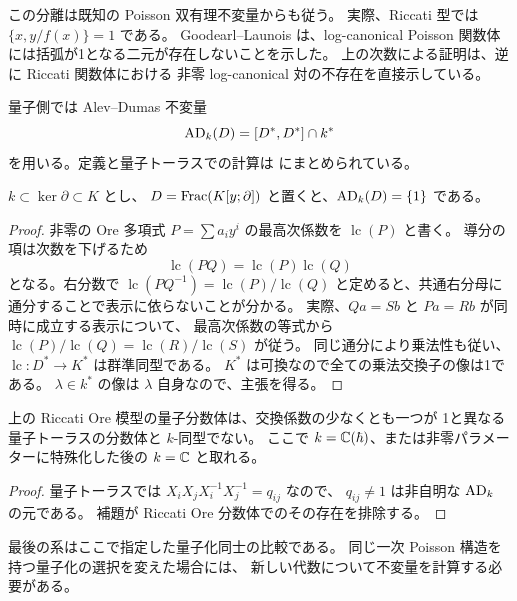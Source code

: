 この分離は既知の Poisson 双有理不変量からも従う。
実際、Riccati 型では $\{x,y/f(x)\}=1$ である。
Goodearl--Launois \cite[命題5.2(a)、系5.3]{GoodearlLaunois}
は、log-canonical Poisson 関数体には括弧が1となる二元が存在しないことを示した。
上の次数による証明は、逆に Riccati 関数体における
非零 log-canonical 対の不存在を直接示している。

量子側では Alev--Dumas 不変量
\[
 \operatorname{AD}_k(D)=[D^*,D^*]\cap k^*
\]
を用いる。定義と量子トーラスでの計算は
\cite[定義3.1、命題3.3]{GoodearlYakimov} にまとめられている。

\begin{lemma}\label{lem:differential-ad}
$k\subset\ker\partial\subset K$ とし、
$D=\operatorname{Frac}(K[y;\partial])$ と置くと、$\operatorname{AD}_k(D)=\{1\}$ である。
\end{lemma}
\begin{proof}
非零の Ore 多項式 $P=\sum a_i y^i$ の最高次係数を
$\operatorname{lc}(P)$ と書く。
導分の項は次数を下げるため
\[
 \operatorname{lc}(PQ)=\operatorname{lc}(P)\operatorname{lc}(Q)
\]
となる。右分数で
$\operatorname{lc}(PQ^{-1})=\operatorname{lc}(P)/\operatorname{lc}(Q)$
と定めると、共通右分母に通分することで表示に依らないことが分かる。
実際、$Qa=Sb$ と $Pa=Rb$ が同時に成立する表示について、
最高次係数の等式から $\operatorname{lc}(P)/\operatorname{lc}(Q)
=\operatorname{lc}(R)/\operatorname{lc}(S)$ が従う。
同じ通分により乗法性も従い、$\operatorname{lc}:D^*\to K^*$ は群準同型である。
$K^*$ は可換なので全ての乗法交換子の像は1である。
$\lambda\in k^*$ の像は $\lambda$ 自身なので、主張を得る。
\end{proof}

\begin{corollary}\label{cor:riccati-not-log-quantum}
上の Riccati Ore 模型の量子分数体は、交換係数の少なくとも一つが
1と異なる量子トーラスの分数体と $k$-同型でない。
ここで $k=\mathbb C(\hbar)$、または非零パラメーターに特殊化した後の $k=\mathbb C$
と取れる。
\end{corollary}
\begin{proof}
量子トーラスでは $X_iX_jX_i^{-1}X_j^{-1}=q_{ij}$ なので、
$q_{ij}\ne1$ は非自明な $\operatorname{AD}_k$ の元である。
補題が Riccati Ore 分数体でのその存在を排除する。
\end{proof}

最後の系はここで指定した量子化同士の比較である。
同じ一次 Poisson 構造を持つ量子化の選択を変えた場合には、
新しい代数について不変量を計算する必要がある。
